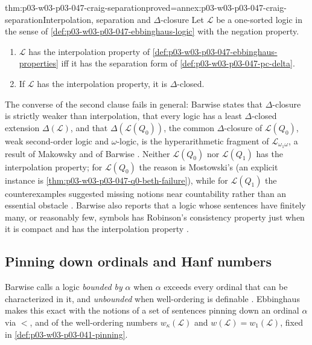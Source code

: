 \begin{hbtheorem}{thm:p03-w03-p03-047-craig-separation}{proved=annex:p03-w03-p03-047-craig-separation}{Interpolation, separation and \(\Delta\)-closure}
Let \(\mathscr L\) be a one-sorted logic in the sense of
\cref{def:p03-w03-p03-047-ebbinghaus-logic} with the negation property.
\begin{enumerate}
 \item \(\mathscr L\) has the interpolation property of
       \cref{def:p03-w03-p03-047-ebbinghaus-properties} iff it has the
       separation form of \cref{def:p03-w03-p03-047-pc-delta}.
 \item If \(\mathscr L\) has the interpolation property, it is
       \(\Delta\)-closed.
\end{enumerate}
\end{hbtheorem}

The converse of the second clause fails in general: Barwise states that
\(\Delta\)-closure is strictly weaker than interpolation, that every logic has
a least \(\Delta\)-closed extension \(\Delta(\mathscr L)\), and that
\(\Delta(\mathscr L(Q_0))\), the common \(\Delta\)-closure of
\(\mathscr L(Q_0)\), weak second-order logic and \(\omega\)-logic, is the
hyperarithmetic fragment of \(\mathscr L_{\omega_1\omega}\), a result of
Makowsky and of Barwise \cite[Ch.~I, \S2.4, p.~18]{Barwise1985BackgroundAims}.
Neither \(\mathscr L(Q_0)\) nor \(\mathscr L(Q_1)\) has the interpolation
property; for \(\mathscr L(Q_0)\) the reason is Mostowski's (an explicit
instance is \cref{thm:p03-w03-p03-047-q0-beth-failure}), while for
\(\mathscr L(Q_1)\) the counterexamples suggested missing notions near
countability rather than an essential obstacle
\cite[Ch.~I, \S2.4, pp.~16--17]{Barwise1985BackgroundAims}.  Barwise also
reports that a logic whose sentences have finitely many, or reasonably few,
symbols has Robinson's consistency property just when it is compact and has
the interpolation property \cite[Ch.~I, \S2.4, p.~16]{Barwise1985BackgroundAims}.

\subsection{Pinning down ordinals and Hanf numbers}

Barwise calls a logic \emph{bounded by} \(\alpha\) when \(\alpha\) exceeds
every ordinal that can be characterized in it, and \emph{unbounded} when
well-ordering is definable \cite[Ch.~I, \S2.5, p.~18]{Barwise1985BackgroundAims}.
Ebbinghaus makes this exact with the notions of a set of sentences pinning
down an ordinal \(\alpha\) via \(<\), and of the well-ordering numbers
\(w_\kappa(\mathscr L)\) and \(w(\mathscr L)=w_1(\mathscr L)\), fixed in
\cref{def:p03-w03-p03-041-pinning}.

